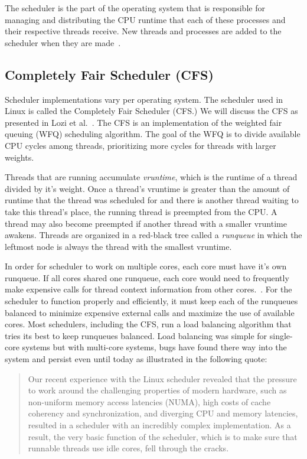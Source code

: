 \documentclass{sig-alternate}
\begin{document}
The scheduler is the part of the operating system that is responsible for managing and distributing the CPU runtime that each of these processes and their respective threads receive. New threads and processes are added to the scheduler when they are made~\cite{Lozi:2016}.

\subsection{Completely Fair Scheduler (CFS)}
\label{sec:cfs}

Scheduler implementations vary per operating system. The scheduler used in Linux is called the Completely Fair Scheduler (CFS.) We will discuss the CFS as presented in Lozi et al.~\cite{Lozi:2016}. The CFS is an implementation of the weighted fair queuing (WFQ) scheduling algorithm. The goal of the WFQ is to divide available CPU cycles among threads, prioritizing more cycles for threads with larger weights.

Threads that are running accumulate \emph{vruntime}, which is the runtime of a thread divided by it's weight. Once a thread's vruntime is greater than the amount of runtime that the thread was scheduled for and there is another thread waiting to take this thread's place, the running thread is preempted from the CPU. A thread may also become preempted if another thread with a smaller vruntime awakens. Threads are organized in a red-black tree called a \emph{runqueue} in which the leftmost node is always the thread with the smallest vruntime.~\cite{Lozi:2016}

In order for scheduler to work on multiple cores, each core must have it's own runqueue. If all cores shared one runqueue, each core would need to frequently make expensive calls for thread context information from other cores.~\cite{Lozi:2016}. For the scheduler to function properly and efficiently, it must keep each of the runqueues balanced to minimize expensive external calls and maximize the use of available cores. Most schedulers, including the CFS, run a load balancing algorithm that tries its best to keep runqueues balanced. Load balancing was simple for single-core systems but with multi-core systems, bugs have found there way into the system and persist even until today as illustrated in the following quote:

\begin{quote}
Our recent experience with the Linux scheduler revealed that the pressure to work around the challenging properties of modern hardware, such as non-uniform memory access latencies (NUMA), high costs of cache coherency and synchronization, and diverging CPU and memory latencies, resulted in a scheduler with an incredibly complex implementation. As a result, the very basic function of the scheduler, which is to make sure that runnable threads use idle cores, fell through the cracks.~\cite{Lozi:2016}
\end{quote}
\end{document}
